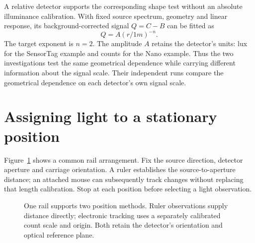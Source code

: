 A relative detector supports the corresponding shape test without an absolute illuminance calibration. With fixed source spectrum, geometry and linear response, its background-corrected signal $Q=C-B$ can be fitted as
\begin{equation}
 Q=A(r/1\unit{m})^{-n}.
 \label{eq:illuminance-distance-power}
\end{equation}
The target exponent is $n=2$. The amplitude $A$ retains the detector's units: lux for the SensorTag example and counts for the Nano example. Thus the two investigations test the same geometrical dependence while carrying different information about the signal scale. Their independent runs compare the geometrical dependence on each detector's own signal scale.

\section{Assigning light to a stationary position}
Figure~\ref{fig:illuminance-distance-apparatus} shows a common rail arrangement. Fix the source direction, detector aperture and carriage orientation. A ruler establishes the source-to-aperture distance; an attached mouse can subsequently track changes without replacing that length calibration. Stop at each position before selecting a light observation.

\begin{figure}[t]
\centering
{}
\caption{One rail supports two position methods. Ruler observations supply distance directly; electronic tracking uses a separately calibrated count scale and origin. Both retain the detector's orientation and optical reference plane.}
\label{fig:illuminance-distance-apparatus}
\end{figure}

